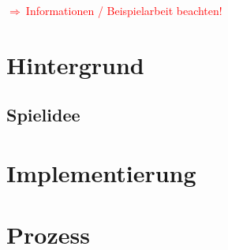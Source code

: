 \documentclass[12pt,a4paper,twoside]{scrartcl}
\newcommand{\todo}[1]{\begin{Large}\textcolor{red}{$\Rightarrow ~$#1}\end{Large}}
\begin{document}


\clearpage

\tableofcontents

\clearpage

\todo{Informationen / Beispielarbeit beachten!}

\section{Hintergrund}
\subsection{Spielidee}

\section{Implementierung}

\section{Prozess}
\end{document}
